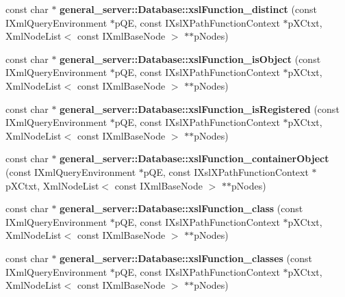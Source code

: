 \begin{DoxyCompactItemize}
\item 
\hypertarget{group__XSLModule-Functions_gae3716816906dd36bf22342299cdb03ae}{const char $\ast$ {\bfseries general\-\_\-server\-::\-Database\-::xsl\-Function\-\_\-distinct} (const \-I\-Xml\-Query\-Environment $\ast$p\-Q\-E, const \-I\-Xsl\-X\-Path\-Function\-Context $\ast$p\-X\-Ctxt, \-Xml\-Node\-List$<$ const \-I\-Xml\-Base\-Node $>$ $\ast$$\ast$p\-Nodes)}\label{group__XSLModule-Functions_gae3716816906dd36bf22342299cdb03ae}

\item 
\hypertarget{group__XSLModule-Functions_ga2548a4a3404cb2095c2489550b0f7023}{const char $\ast$ {\bfseries general\-\_\-server\-::\-Database\-::xsl\-Function\-\_\-is\-Object} (const \-I\-Xml\-Query\-Environment $\ast$p\-Q\-E, const \-I\-Xsl\-X\-Path\-Function\-Context $\ast$p\-X\-Ctxt, \-Xml\-Node\-List$<$ const \-I\-Xml\-Base\-Node $>$ $\ast$$\ast$p\-Nodes)}\label{group__XSLModule-Functions_ga2548a4a3404cb2095c2489550b0f7023}

\item 
\hypertarget{group__XSLModule-Functions_gab293bbff4f5db47161867047cf1b11ec}{const char $\ast$ {\bfseries general\-\_\-server\-::\-Database\-::xsl\-Function\-\_\-is\-Registered} (const \-I\-Xml\-Query\-Environment $\ast$p\-Q\-E, const \-I\-Xsl\-X\-Path\-Function\-Context $\ast$p\-X\-Ctxt, \-Xml\-Node\-List$<$ const \-I\-Xml\-Base\-Node $>$ $\ast$$\ast$p\-Nodes)}\label{group__XSLModule-Functions_gab293bbff4f5db47161867047cf1b11ec}

\item 
\hypertarget{group__XSLModule-Functions_ga59fe6ab8210a3e16958ead0d29c44a18}{const char $\ast$ {\bfseries general\-\_\-server\-::\-Database\-::xsl\-Function\-\_\-container\-Object} (const \-I\-Xml\-Query\-Environment $\ast$p\-Q\-E, const \-I\-Xsl\-X\-Path\-Function\-Context $\ast$p\-X\-Ctxt, \-Xml\-Node\-List$<$ const \-I\-Xml\-Base\-Node $>$ $\ast$$\ast$p\-Nodes)}\label{group__XSLModule-Functions_ga59fe6ab8210a3e16958ead0d29c44a18}

\item 
\hypertarget{group__XSLModule-Functions_ga18e9a88a14db42649b02c6adb815b78a}{const char $\ast$ {\bfseries general\-\_\-server\-::\-Database\-::xsl\-Function\-\_\-class} (const \-I\-Xml\-Query\-Environment $\ast$p\-Q\-E, const \-I\-Xsl\-X\-Path\-Function\-Context $\ast$p\-X\-Ctxt, \-Xml\-Node\-List$<$ const \-I\-Xml\-Base\-Node $>$ $\ast$$\ast$p\-Nodes)}\label{group__XSLModule-Functions_ga18e9a88a14db42649b02c6adb815b78a}

\item 
\hypertarget{group__XSLModule-Functions_ga5e92759166ded9b8aa524e87e2256930}{const char $\ast$ {\bfseries general\-\_\-server\-::\-Database\-::xsl\-Function\-\_\-classes} (const \-I\-Xml\-Query\-Environment $\ast$p\-Q\-E, const \-I\-Xsl\-X\-Path\-Function\-Context $\ast$p\-X\-Ctxt, \-Xml\-Node\-List$<$ const \-I\-Xml\-Base\-Node $>$ $\ast$$\ast$p\-Nodes)}\label{group__XSLModule-Functions_ga5e92759166ded9b8aa524e87e2256930}


\end{DoxyCompactItemize}
